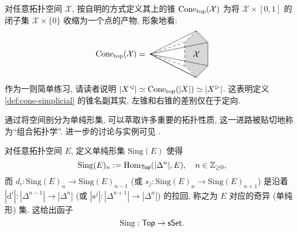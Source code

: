 \begin{example}\label{eg:cone-realization}
	对任意拓扑空间 $\mathcal{X}$, 按自明的方式定义其上的锥 $\operatorname{Cone}_{\mathrm{top}}(\mathcal{X})$ 为将 $\mathcal{X} \times [0, 1]$ 的闭子集 $\mathcal{X} \times \{0\}$ 收缩为一个点的产物, 形象地看:
	\[\Cone_{\mathrm{top}}(\mathcal{X}) = \; \begin{tikzpicture}[baseline=(P)]
		\coordinate (A) at (0, 1);
		\coordinate (B) at (0.5, 0.5);
		\coordinate (C) at (0.5, -0.5);
		\coordinate (D) at (0, -1);
		\coordinate (E) at (-0.5, -0.5);
		\coordinate (F) at (-0.5, 0.5);
		\coordinate (O) at (-2, 0);
		\coordinate (P) at (0, -0.1);	%
		
		\fill[gray!50, opacity=0.6] (A) -- (B) -- (C) -- (D) -- (E) -- (F) --cycle;
		\draw (O) -- (A) -- (B) -- (C) -- (D) --cycle;
		\draw (O) -- (B);
		\draw (O) -- (C);
		\draw (O) -- (D);
		\draw[dashed] (D) -- (E) -- (F) -- (A);
		\draw[dashed] (O) -- (E);
		\draw[dashed] (O) -- (F);
		\node at (0, 0) {$\mathcal{X}$};
	\end{tikzpicture}\]
	作为一则简单练习, 请读者说明 $|X^{\lhd}| \simeq \operatorname{Cone}_{\mathrm{top}}(|X|) \simeq |X^{\rhd}|$. 这表明定义 \ref{def:cone-simplicial} 的锥名副其实, 左锥和右锥的差别仅在于定向.
\end{example}

通过将空间剖分为单纯形集, 可以萃取许多重要的拓扑性质, 这一进路被贴切地称为``组合拓扑学''. 进一步的讨论与实例可见 \cite[第六章]{You}.

\begin{definition}[奇异集函子]
	对任意拓扑空间 $E$, 定义单纯形集 $\mathrm{Sing}(E)$ 使得
	\[ \mathrm{Sing}(E)_n := \operatorname{Hom}_{\mathsf{Top}}(|\Delta^n|, E), \quad n \in \mathbb{Z}_{\geq 0}, \]
	而 $d_i: \mathrm{Sing}(E)_n \to \mathrm{Sing}(E)_{n-1}$ (或 $s_j: \mathrm{Sing}(E)_n \to \mathrm{Sing}(E)_{n+1}$) 是沿着 $|\mathrm{d}^i|: |\Delta^{n-1}| \to |\Delta^n|$ (或 $|\mathrm{s}^j|: |\Delta^{n+1}| \to |\Delta^n|$) 的拉回, 称之为 $E$ 对应的奇异 (单纯形) 集. 这给出函子
	\[ \mathrm{Sing}: \mathsf{Top} \to \mathsf{sSet}. \]
\end{definition}

